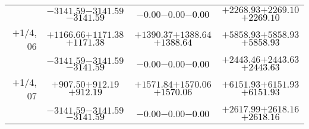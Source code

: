 \documentclass[compress]{beamer}
\begin{document}
\begin{frame}
{\begin{tabular}{r | c | c | c}
           & $-3141.59$\hspace{0.1 cm}$-3141.59$\hspace{0.1 cm}\textcolor{black}{$-3141.59$} & $-0.00$\hspace{0.1 cm}$-0.00$\hspace{0.1 cm}\textcolor{black}{$-0.00$} & $+2268.93$\hspace{0.1 cm}$+2269.10$\hspace{0.1 cm}\textcolor{black}{$+2269.10$} \\
$+$1/4, 06 & $+1166.66$\hspace{0.1 cm}$+1171.38$\hspace{0.1 cm}\textcolor{black}{$+1171.38$} & $+1390.37$\hspace{0.1 cm}$+1388.64$\hspace{0.1 cm}\textcolor{black}{$+1388.64$} & $+5858.93$\hspace{0.1 cm}$+5858.93$\hspace{0.1 cm}\textcolor{black}{$+5858.93$} \\
           & $-3141.59$\hspace{0.1 cm}$-3141.59$\hspace{0.1 cm}\textcolor{black}{$-3141.59$} & $-0.00$\hspace{0.1 cm}$-0.00$\hspace{0.1 cm}\textcolor{black}{$-0.00$} & $+2443.46$\hspace{0.1 cm}$+2443.63$\hspace{0.1 cm}\textcolor{black}{$+2443.63$} \\
$+$1/4, 07 & $+907.50$\hspace{0.1 cm}$+912.19$\hspace{0.1 cm}\textcolor{black}{$+912.19$} & $+1571.84$\hspace{0.1 cm}$+1570.06$\hspace{0.1 cm}\textcolor{black}{$+1570.06$} & $+6151.93$\hspace{0.1 cm}$+6151.93$\hspace{0.1 cm}\textcolor{black}{$+6151.93$} \\
           & $-3141.59$\hspace{0.1 cm}$-3141.59$\hspace{0.1 cm}\textcolor{black}{$-3141.59$} & $-0.00$\hspace{0.1 cm}$-0.00$\hspace{0.1 cm}\textcolor{black}{$-0.00$} & $+2617.99$\hspace{0.1 cm}$+2618.16$\hspace{0.1 cm}\textcolor{black}{$+2618.16$} \\

\end{tabular}}
\end{frame}
\end{document}
